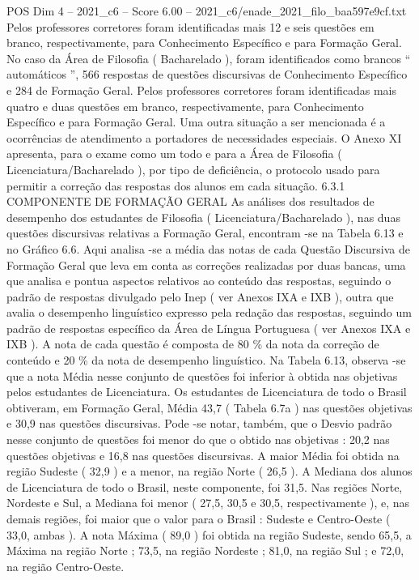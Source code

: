 \begin{textsample}{POS Dim 4 – 2021\_c6 – Score 6.00 – 2021\_c6/enade\_2021\_filo\_baa597e9cf.txt}
Pelos professores corretores foram identificadas mais 12 e seis questões em branco, respectivamente, para Conhecimento Específico e para Formação Geral.
No caso da Área de Filosofia ( Bacharelado ), foram identificados como brancos “ automáticos ”, 566 respostas de questões discursivas de Conhecimento Específico e 284 de Formação Geral.
Pelos professores corretores foram identificadas mais quatro e duas questões em branco, respectivamente, para Conhecimento Específico e para Formação Geral.
Uma outra situação a ser mencionada é a ocorrências de atendimento a portadores de necessidades especiais.
O Anexo XI apresenta, para o exame como um todo e para a Área de Filosofia ( Licenciatura/Bacharelado ), por tipo de deficiência, o protocolo usado para permitir a correção das respostas dos alunos em cada situação. 6.3.1 COMPONENTE DE FORMAÇÃO GERAL As análises dos resultados de desempenho dos estudantes de Filosofia ( Licenciatura/Bacharelado ), nas duas questões discursivas relativas a Formação Geral, encontram -se na Tabela 6.13 e no Gráfico 6.6.
Aqui analisa -se a média das notas de cada Questão Discursiva de Formação Geral que leva em conta as correções realizadas por duas bancas, uma que analisa e pontua aspectos relativos ao conteúdo das respostas, seguindo o padrão de respostas divulgado pelo Inep ( ver Anexos IXA e IXB ), outra que avalia o desempenho linguístico expresso pela redação das respostas, seguindo um padrão de respostas específico da Área de Língua Portuguesa ( ver Anexos IXA e IXB ).
A nota de cada questão é composta de 80 \% da nota da correção de conteúdo e 20 \% da nota de desempenho linguístico.
Na Tabela 6.13, observa -se que a nota Média nesse conjunto de questões foi inferior à obtida nas objetivas pelos estudantes de Licenciatura.
Os estudantes de Licenciatura de todo o Brasil obtiveram, em Formação Geral, Média 43,7 ( Tabela 6.7a ) nas questões objetivas e 30,9 nas questões discursivas.
Pode -se notar, também, que o Desvio padrão nesse conjunto de questões foi menor do que o obtido nas objetivas : 20,2 nas questões objetivas e 16,8 nas questões discursivas.
A maior Média foi obtida na região Sudeste ( 32,9 ) e a menor, na região Norte ( 26,5 ).
A Mediana dos alunos de Licenciatura de todo o Brasil, neste componente, foi 31,5.
Nas regiões Norte, Nordeste e Sul, a Mediana foi menor ( 27,5, 30,5 e 30,5, respectivamente ), e, nas demais regiões, foi maior que o valor para o Brasil : Sudeste e Centro-Oeste ( 33,0, ambas ).
A nota Máxima ( 89,0 ) foi obtida na região Sudeste, sendo 65,5, a Máxima na região Norte ; 73,5, na região Nordeste ; 81,0, na região Sul ; e 72,0, na região Centro-Oeste.

\end{textsample}
